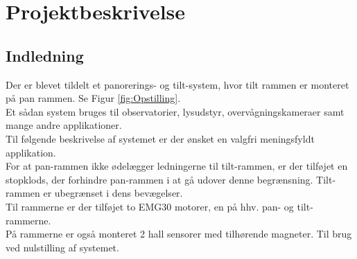 \section{Projektbeskrivelse}

\subsection{Indledning}
Der er blevet tildelt et panorerings- og tilt-system, hvor tilt rammen er monteret på pan rammen. Se Figur \ref{fig:Opstilling}.\\
Et sådan system bruges til observatorier, lysudstyr, overvågningskameraer samt mange andre applikationer.\\
Til følgende beskrivelse af systemet er der ønsket en valgfri meningsfyldt applikation.\\
For at pan-rammen ikke ødelægger ledningerne til tilt-rammen, er der tilføjet en stopklods, der forhindre pan-rammen i at gå udover denne begrænsning. Tilt-rammen er ubegrænset i dens bevægelser.\\
Til rammerne er der tilføjet to EMG30\cite{emg30Data} motorer, en på hhv. pan- og tilt-rammerne.\\
På rammerne er også monteret 2 hall sensorer med tilhørende magneter. Til brug ved nulstilling af systemet.

